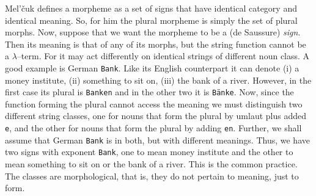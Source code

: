 Mel'\v{c}uk 
defines a morpheme as a set of signs that have identical
category and identical meaning. So, for him the plural morpheme is
simply the set of plural morphs. Now, suppose that we want the
morpheme to be a (de Saussure) {\it sign}. Then its meaning is that 
of any of its morphs, but the string function cannot be a 
$\lambda$--term. For it may act differently on identical strings of 
different noun class. A good example is German {\tt Bank}. 
Like its English counterpart it can denote (i) a money institute, (ii) 
something to sit on, (iii) the bank of a river. However, in the first case 
its plural is {\tt Banken} and in the other two it is {\tt B\"anke}. Now, 
since the function forming the plural cannot access the meaning we 
must distinguish two different string classes, one for nouns that 
form the plural by umlaut plus added {\tt e}, and the other for 
nouns that form the plural by adding {\tt en}. Further, we shall 
assume that German {\tt Bank} is in both, but with different meanings.
Thus, we have two signs with exponent {\tt Bank}, one to mean money
institute and the other to mean something to sit on or the bank of
a river. This is the common practice. The classes are morphological,
that is, they do not pertain to meaning, just to form.

